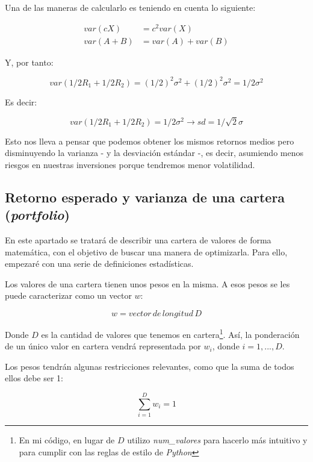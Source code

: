 Una de las maneras de calcularlo es teniendo en cuenta lo siguiente:

\begin{align}
	var(cX) &= c^{2}var(X)\\
	var(A + B) &= var(A) + var(B)
\end{align}

Y, por tanto:

\begin{equation}
	var(1/2R_{1} + 1/2R_{2}) = (1/2)^{2}\sigma^{2} + (1/2)^{2}\sigma^{2} = 1/2\sigma^{2}
\end{equation}

Es decir: 

\begin{equation}
	var(1/2R_{1} + 1/2R_{2}) = 1/2\sigma^{2} \rightarrow sd = 1/\sqrt{2}\sigma
\end{equation}


Esto nos lleva a pensar que podemos obtener los mismos retornos medios pero disminuyendo la varianza - y la desviación estándar -, es decir, asumiendo menos riesgos en nuestras inversiones porque tendremos menor volatilidad. 

\subsection{Retorno esperado y varianza de una cartera (\emph{portfolio})}

En este apartado se tratará de describir una cartera de valores de forma matemática, con el objetivo de buscar una manera de optimizarla. Para ello, empezaré con una serie de definiciones estadísticas.

Los valores de una cartera tienen unos pesos en la misma. A esos pesos se les puede caracterizar como un vector $w$:

\begin{equation*}
	w = vector\, de\, longitud\, D
\end{equation*}

Donde $D$ es la cantidad de valores que tenemos en cartera\footnote{En mi código, en lugar de $D$ utilizo \textit{num\_valores} para hacerlo más intuitivo y para cumplir con las reglas de estilo de \textit{Python}}. Así, la ponderación de un único valor en cartera vendrá representada por $w_{i}$, donde $i = 1,...,D$.

Los pesos tendrán algunas restricciones relevantes, como que la suma de todos ellos debe ser 1:

\begin{equation}
	\sum_{i=1}^{D}w_{i} = 1
\end{equation}


